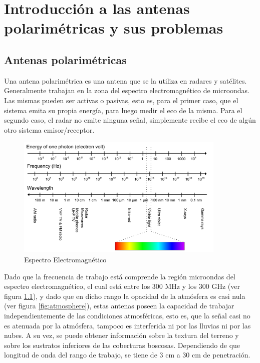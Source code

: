 
\chapter{Introducción a las antenas polarimétricas y sus problemas} %
\label{ch:motivacion}

\section{Antenas polarimétricas}

Una antena polarimétrica es una antena que se la utiliza en radares y satélites. Generalmente trabajan en la
zona del espectro electromagnético de microondas. Las mismas pueden ser activas o pasivas, esto es, para el
primer caso, que el sistema emita su propia energía, para luego medir el eco de la misma. Para el segundo caso,
el radar no emite ninguna señal, simplemente recibe el eco de algún otro sistema emisor/receptor.

\begin{figure}[H]
 \centering
 \includegraphics[width=10cm]{gfx/electromagneticSpectrum.png}
 \caption{Espectro Electromagnético}
 \label{fig:spectrum}
\end{figure}


Dado que la frecuencia de trabajo está comprende la región microondas del espectro electromagnético, el cual está entre los 
300 MHz y los 300 GHz (ver figura \ref{fig:spectrum}), y dado que en dicho rango la opacidad de la atmósfera es casi nula 
(ver figura \ref{fig:atmosphere}), estas antenas poseen la capacidad de trabajar independientemente de las condiciones 
atmosféricas, esto es, que la señal casi no es atenuada por la atmósfera, tampoco es interferida ni por las lluvias ni por 
las nubes. A su vez, se puede obtener información sobre la textura del terreno y sobre los sustratos inferiores de las 
coberturas boscosas. Dependiendo de que longitud de onda del rango de trabajo, se tiene de 3 cm a 30 cm de penetración.

